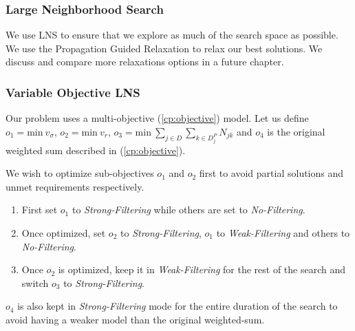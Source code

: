 \documentclass[../../thesis.tex]{subfiles}
\begin{document}
\subsubsection{Large Neighborhood Search}

We use LNS to ensure that we explore as much of the search space as possible. 
We use the Propagation Guided Relaxation \cite{Propagation:LNS} to relax our best solutions.
We discuss and compare more relaxations options in a future chapter.

\subsubsection{Variable Objective LNS}

Our problem uses a multi-objective (\ref{cp:objective}) model. 
Let us define $o_1 = \text{min} \ v_{\sigma}$, $o_2 = {\text{min} \ v_r}$, $o_3 = {\text{min} \ \sum_{j \in D} \sum_{k \in D^P_j} N_{jk}}$
and $o_4$ is the original weighted sum described in (\ref{cp:objective}).


We wish to optimize sub-objectives $o_1$ and $o_2$ first to avoid partial solutions and unmet requirements respectively. 

\begin{enumerate}
  \item First set $o_1$ to \emph{Strong-Filtering} while others are set to \emph{No-Filtering}.
  \item Once optimized, set $o_2$ to \emph{Strong-Filtering}, $o_1$ to \emph{Weak-Filtering} and others to \emph{No-Filtering}.
  \item Once $o_2$ is optimized, keep it in \emph{Weak-Filtering} for the rest of the search and switch $o_3$ to \emph{Strong-Filtering}.
\end{enumerate}

$o_4$ is also kept in \emph{Strong-Filtering} mode for the entire duration of the search to avoid having a weaker model than the original weighted-sum.
\end{document}
